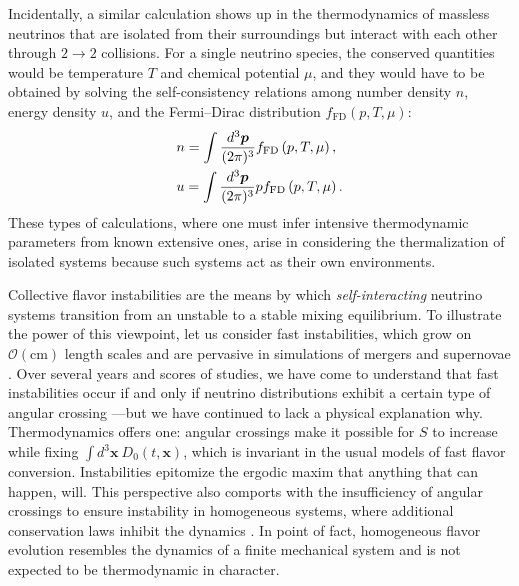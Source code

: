 \documentclass[aps,prd,twocolumn,groupedaddress,preprintnumbers]{revtex4-2}
\begin{document}
Incidentally, a similar calculation shows up in the thermodynamics of massless neutrinos that are isolated from their surroundings but interact with each other through $2 \rightarrow 2$ collisions. For a single neutrino species, the conserved quantities would be temperature $T$ and chemical potential $\mu$, and they would have to be obtained by solving the self-consistency relations among number density $n$, energy density $u$, and the Fermi--Dirac distribution $f_\textrm{FD} (p, T, \mu)$:
\begin{align}
&n = \int \frac{d^3 \boldsymbol{p}}{(2\pi)^3} f_\textrm{FD} \left( p, T, \mu \right), \notag \\
&u = \int \frac{d^3 \boldsymbol{p}}{(2\pi)^3} p f_\textrm{FD} \left( p, T, \mu \right).
\end{align} 
These types of calculations, where one must infer intensive thermodynamic parameters from known extensive ones, arise in considering the thermalization of isolated systems because such systems act as their own environments.




Collective flavor instabilities are the means by which \textit{self-interacting} neutrino systems transition from an unstable to a stable mixing equilibrium. To illustrate the power of this viewpoint, let us consider fast instabilities, which grow on $\mathcal{O}(\textrm{cm})$ length scales and are pervasive in simulations of mergers and supernovae \cite{tamborra2021, richers2022}. Over several years and scores of studies, we have come to understand that fast instabilities occur if and only if neutrino distributions exhibit a certain type of angular crossing \cite{sawyer2016, chakraborty2016c, dasgupta2017, izaguirre2017, capozzi2017, abbar2018, capozzi2019, martin2020, johns2021, morinaga2022, dasgupta2022}---but we have continued to lack a physical explanation why. Thermodynamics offers one: angular crossings make it possible for $S$ to increase while fixing $\int d^3\boldsymbol{x}~D_0 (t, \boldsymbol{x})$, which is invariant in the usual models of fast flavor conversion. Instabilities epitomize the ergodic maxim that anything that can happen, will. This perspective also comports with the insufficiency of angular crossings to ensure instability in homogeneous systems, where additional conservation laws inhibit the dynamics \cite{johns2020}. In point of fact, homogeneous flavor evolution resembles the dynamics of a finite mechanical system \cite{hannestad2006, duan2007b, raffelt2013b, johns2018, johns2020, padillagay2022, fiorillo2023, fiorillo2023b} and is not expected to be thermodynamic in character.
\end{document}
